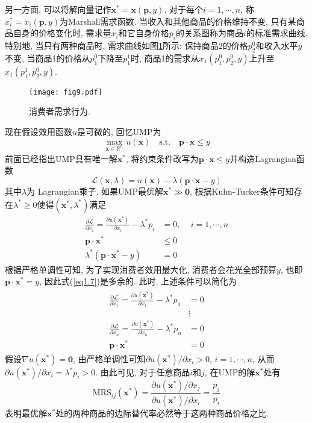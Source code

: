 \documentclass[cn, 12pt, math=mtpro2, bibstyle=apa, blue, twocol]{elegantbook}
\newcommand{\R}{\mathbb{R}}
\newcommand{\p}{\mathbf{p}}
\newcommand{\x}{\mathbf{x}}
\begin{document}
另一方面, 可以将解向量记作$\x^\ast=\x(\p,y)$. 对于每个$i=1,\cdots,n$, 称$x_i^\ast=x_i(\p,y)$为Marshall需求函数. 当收入和其他商品的价格维持不变, 只有某商品自身的价格变化时, 需求量$x_i$和它自身价格$p_i$的关系图称为商品$i$的标准需求曲线. 特别地, 当只有两种商品时, 需求曲线如图\ref{fig1.9}所示: 保持商品2的价格$p_2^0$和收入水平$y$不变, 当商品1的价格从$p_1^0$下降至$p_1^1$时, 商品1的需求从$x_1(p_1^0,p_2^0,y)$上升至$x_1(p_1^1,p_2^0,y)$.
\begin{figure}[htbp!]
  \centering
  \texttt{[image: fig9.pdf]}
  \caption{消费者需求行为.}\label{fig1.9}
\end{figure}

现在假设效用函数$u$是可微的, 回忆UMP为
\begin{equation}\label{eq1.4}
  \max_{\x\in\R^n_+} u(\x)\quad \text{s.t.}\quad \p\cdot\x\leq y
\end{equation}
前面已经指出UMP具有唯一解$\x^\ast$, 将约束条件改写为$\p\cdot\x\leq y$并构造Lagrangian函数
$$\mathcal{L}(\x,\lambda)=u(\x)-\lambda(\p\cdot\x-y)$$
其中$\lambda$为 Lagrangian乘子. 如果UMP最优解$\x^\ast\gg\mathbf{0}$, 根据Kuhn-Tucker条件可知存在$\lambda^\ast\ge0$使得$(\x^\ast,\lambda^\ast)$满足
\begin{align}
\frac{\partial\mathcal{L}}{\partial x_i}=\frac{\partial u(\x^\ast)}{\partial x_i}-\lambda^\ast p_i&=0,\,\quad i=1,\cdots, n \label{eq1.5} \\
\p\cdot\x^\ast&\leq 0  \label{eq1.6} \\
\lambda^\ast(\p\cdot\x^\ast-y)&=0 \label{eq1.7}
\end{align}
根据严格单调性可知, 为了实现消费者效用最大化, 消费者会花光全部预算$y$, 也即$\p\cdot\x^\ast=y$, 因此式(\ref{eq1.7})是多余的. 此时, 上述条件可以简化为
\begin{align}
\begin{split}
\frac{\partial\mathcal{L}}{\partial x_1}=\frac{\partial u(\x^\ast)}{\partial x_1}-\lambda^\ast p_1&=0  \\
&\vdots  \\
\frac{\partial\mathcal{L}}{\partial x_n}=\frac{\partial u(\x^\ast)}{\partial x_n}-\lambda^\ast p_n&=0 \\
\p\cdot\x^\ast&=0
\end{split}
\label{eq1.8}
\end{align}
假设$\nabla u(\x^\ast)=\mathbf{0}$, 由严格单调性可知$\partial u(\x^\ast)/\partial x_i>0$, $i=1,\cdots,n$, 从而$\partial u(\x^\ast)/\partial x_i=\lambda^\ast p_i>0$. 由此可见, 对于任意商品$i$和$j$, 在UMP的解$\x^\ast$处有
\begin{equation}\label{eq1.9}
  \text{MRS}_{ij}(\x^\ast)=\frac{\partial u(\x^\ast)/\partial x_j}{\partial u(\x^\ast)/\partial x_i}=\frac{p_j}{p_i}
\end{equation}
表明最优解$\x^\ast$处的两种商品的边际替代率必然等于这两种商品价格之比.
\end{document}
